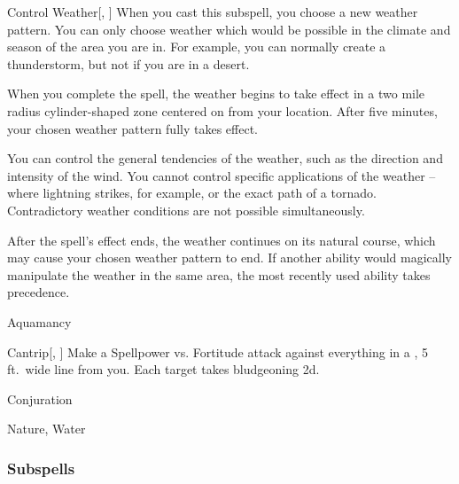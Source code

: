 \begin{ability}[\nth{7}]{Control Weather}[, ]
When you cast this subspell, you choose a new weather pattern.
You can only choose weather which would be possible in the climate and season of the area you are in.
For example, you can normally create a thunderstorm, but not if you are in a desert.

When you complete the spell, the weather begins to take effect in a two mile radius cylinder-shaped zone centered on from your location.
After five minutes, your chosen weather pattern fully takes effect.

You can control the general tendencies of the weather, such as the direction and intensity of the wind.
You cannot control specific applications of the weather -- where lightning strikes, for example, or the exact path of a tornado.
Contradictory weather conditions are not possible simultaneously.

After the spell's effect ends, the weather continues on its natural course, which may cause your chosen weather pattern to end.
If another ability would magically manipulate the weather in the same area, the most recently used ability takes precedence.
\end{ability}
\vspace{0.25em}

\newpage
\begin{spellsection}{Aquamancy}

\begin{spellheader}
\end{spellheader}


\begin{ability}{Cantrip}[, ]
Make a Spellpower vs. Fortitude attack against everything in a \areamed, 5 ft.\ wide line from you.
\hit Each target takes bludgeoning  \minus2d.
\end{ability}




 Conjuration

 Nature, Water
\end{spellsection}


\subsubsection{Subspells}


